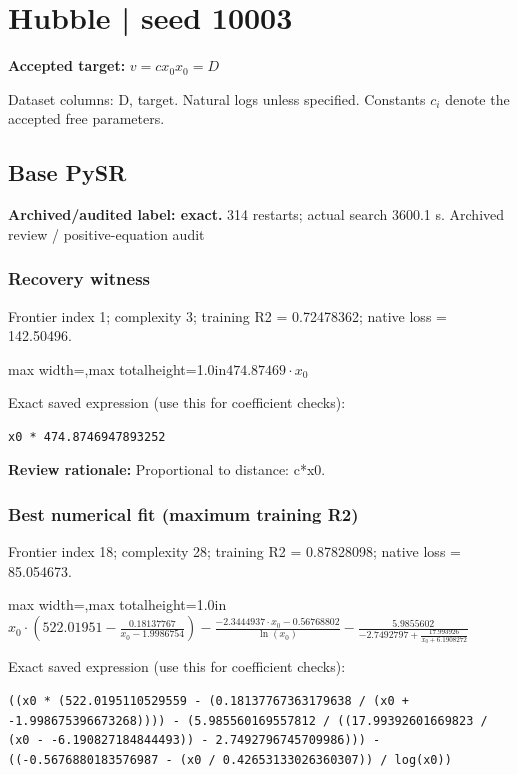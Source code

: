 \documentclass[10pt,letterpaper,landscape]{article}
\begin{document}
\section*{Hubble | seed 10003}
\textbf{Accepted target:} $\displaystyle v=c x_0$\hfill $x_0=D$\par
{\small Dataset columns: D, target. Natural logs unless specified. Constants $c_i$ denote the accepted free parameters.}\par\medskip
\begin{minipage}[t]{0.485\textwidth}
\subsection*{Base PySR}
\textbf{Archived/audited label: exact.} 314 restarts; actual search 3600.1 s.
{\small Archived review / positive-equation audit}
\subsubsection*{Recovery witness}
Frontier index 1; complexity 3; training R2 = 0.72478362; native loss = 142.50496.
\begin{center}\begin{adjustbox}{max width=\linewidth,max totalheight=1.0in}$\displaystyle 474.87469 \cdot x_{0}$\end{adjustbox}\end{center}
{\scriptsize Exact saved expression (use this for coefficient checks):}
\begin{lstlisting}
x0 * 474.8746947893252
\end{lstlisting}
{\small\textbf{Review rationale:} Proportional to distance: c*x0.}
\subsubsection*{Best numerical fit (maximum training R2)}
Frontier index 18; complexity 28; training R2 = 0.87828098; native loss = 85.054673.
\begin{center}\begin{adjustbox}{max width=\linewidth,max totalheight=1.0in}$\displaystyle x_{0} \cdot \left(522.01951 - \frac{0.18137767}{x_{0} - 1.9986754}\right) - \frac{- 2.3444937 \cdot x_{0} - 0.56768802}{\ln{\left(x_{0} \right)}} - \frac{5.9855602}{-2.7492797 + \frac{17.993926}{x_{0} + 6.1908272}}$\end{adjustbox}\end{center}
{\scriptsize Exact saved expression (use this for coefficient checks):}
\begin{lstlisting}
((x0 * (522.0195110529559 - (0.18137767363179638 / (x0 + -1.998675396673268)))) - (5.985560169557812 / ((17.99392601669823 / (x0 - -6.190827184844493)) - 2.7492796745709986))) - ((-0.5676880183576987 - (x0 / 0.42653133026360307)) / log(x0))
\end{lstlisting}
\end{minipage}\hfill
\end{document}

